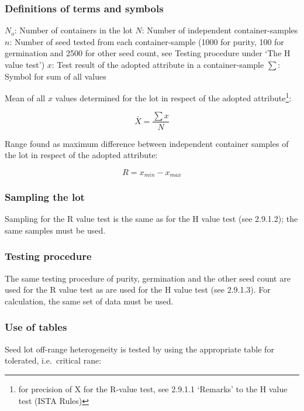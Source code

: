 \documentclass[
]{book}
\begin{document}
\hypertarget{definitions-of-terms-and-symbols-1}{%
\subsubsection{Definitions of terms and symbols}\label{definitions-of-terms-and-symbols-1}}

\(N_o\): Number of containers in the lot
\(N\): Number of independent container-samples
\(n\): Number of seed tested from each container-sample (1000 for purity, 100 for germination and 2500 for other seed count, see Testing procedure under `The H value test')
\(x\): Test result of the adopted attribute in a container-sample
\(\sum\): Symbol for sum of all values

Mean of all \(x\) values determined for the lot in respect of the adopted attribute\footnote{for precision of X for the R-value test, see 2.9.1.1 `Remarks' to the H value test (ISTA Rules)}:

\[
\bar{X} = \frac{\sum{x}}{N}
\]

Range found as maximum difference between independent container samples of the lot in respect of the adopted attribute:

\[
R = x_{min} - x_{max}
\]

\hypertarget{sampling-the-lot-1}{%
\subsubsection{Sampling the lot}\label{sampling-the-lot-1}}

Sampling for the R value test is the same as for the H value test (see 2.9.1.2); the same samples must be used.

\hypertarget{testing-procedure-1}{%
\subsubsection{Testing procedure}\label{testing-procedure-1}}

The same testing procedure of purity, germination and the other seed count are used for the R value test as are used for the H value test (see 2.9.1.3). For calculation, the same set of data must be used.

\hypertarget{use-of-tables}{%
\subsubsection{Use of tables}\label{use-of-tables}}

Seed lot off-range heterogeneity is tested by using the appropriate table for tolerated, i.e.~critical rane:
\end{document}
